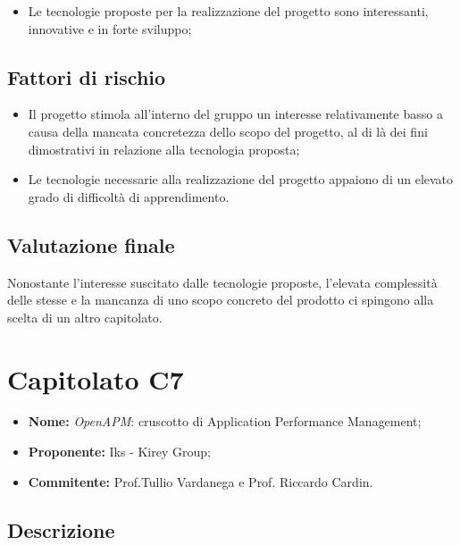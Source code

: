 \documentclass[openany,12pt,a4paper]{report}
\begin{document}
	\begin{itemize}
		\item Le tecnologie proposte per la realizzazione del progetto sono interessanti, innovative e in forte sviluppo;
	\end{itemize}

	\subsection{Fattori di rischio}

	\begin{itemize}
		\item Il progetto stimola all'interno del gruppo un interesse relativamente basso a causa della mancata concretezza dello scopo del progetto, al di là dei fini dimostrativi in relazione alla tecnologia proposta;

		\item Le tecnologie necessarie alla realizzazione del progetto appaiono di un elevato grado di difficoltà di apprendimento.
	\end{itemize}

	\subsection{Valutazione finale}

	Nonostante l'interesse suscitato dalle tecnologie proposte, l'elevata complessità delle stesse e la mancanza di uno scopo concreto del prodotto ci spingono alla scelta di un altro capitolato.


	\section{Capitolato C7}

	\begin{itemize}
		\item \textbf{Nome:} \textit{OpenAPM}: cruscotto di Application Performance Management;
		\item \textbf{Proponente:} Iks - Kirey Group;
		\item \textbf{Commitente:} Prof.Tullio Vardanega e Prof. Riccardo Cardin.
	\end{itemize}

	\subsection{Descrizione}
\end{document}
